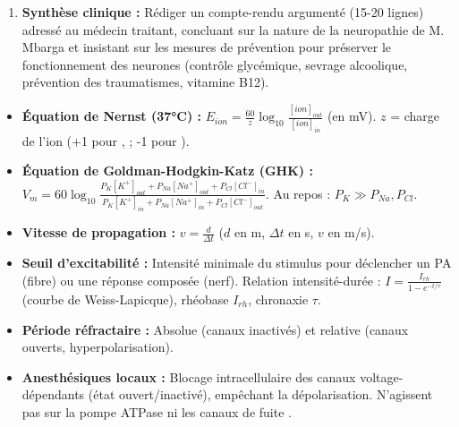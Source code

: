 \documentclass[11pt]{article}
\newcounter{popsec}
\newcounter{popsub}
\newcommand{\courssub}[1]{%
  \stepcounter{popsub}%
  \par\vspace{9pt}\noindent{\popxbold\fontsize{11.5}{13}\selectfont\color{popink}{\color{poporange}\thepopsec.\thepopsub}\hspace{6pt}#1}\par\nopagebreak\vspace{4pt}
}
\begin{document}
\begin{enumerate}
\begin{enumerate}
        \item Décrire l'effet de la lidocaïne sur le potentiel d'action et sur le potentiel de repos. 
        \item Expliquer le mécanisme d'action moléculaire de la lidocaïne sur les canaux  voltage-dépendants (blocage \emph{use-dependent}). 
        \item Pourquoi le potentiel de repos n'est-il pas modifié ?
    \end{enumerate}
    \item \textbf{Synthèse clinique :} Rédiger un compte-rendu argumenté (15-20 lignes) adressé au médecin traitant, concluant sur la nature de la neuropathie de M. Mbarga et insistant sur les mesures de prévention pour préserver le fonctionnement des neurones (contrôle glycémique, sevrage alcoolique, prévention des traumatismes, vitamine B12).
\end{enumerate}

\courssub{Ressources à mobiliser}
\begin{itemize}
    \item \textbf{Équation de Nernst (37°C) :} $E_{ion} = \frac{60}{z} \log_{10} \frac{[ion]_{out}}{[ion]_{in}}$ (en mV). $z$ = charge de l'ion (+1 pour ,  ; -1 pour ).
    \item \textbf{Équation de Goldman-Hodgkin-Katz (GHK) :} $V_m = 60 \log_{10} \frac{P_K[K^+]_{out} + P_{Na}[Na^+]_{out} + P_{Cl}[Cl^-]_{in}}{P_K[K^+]_{in} + P_{Na}[Na^+]_{in} + P_{Cl}[Cl^-]_{out}}$. Au repos : $P_K \gg P_{Na}, P_{Cl}$.
    \item \textbf{Vitesse de propagation :} $v = \frac{d}{\Delta t}$ ($d$ en m, $\Delta t$ en s, $v$ en m/s).
    \item \textbf{Seuil d'excitabilité :} Intensité minimale du stimulus pour déclencher un PA (fibre) ou une réponse composée (nerf). Relation intensité-durée : $I = \frac{I_{rh}}{1 - e^{-t/\tau}}$ (courbe de Weiss-Lapicque), rhéobase $I_{rh}$, chronaxie $\tau$.
    \item \textbf{Période réfractaire :} Absolue (canaux  inactivés) et relative (canaux  ouverts, hyperpolarisation).
    \item \textbf{Anesthésiques locaux :} Blocage intracellulaire des canaux  voltage-dépendants (état ouvert/inactivé), empêchant la dépolarisation. N'agissent pas sur la pompe  ATPase ni les canaux de fuite .
\end{itemize}
\end{document}
